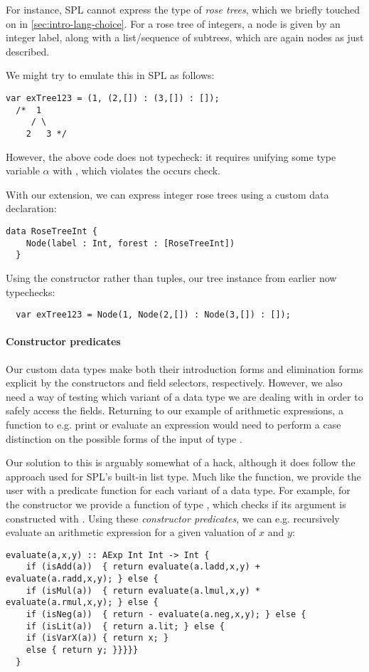 For instance, SPL cannot express the type of \emph{rose trees}, which we briefly
touched on in \cref{sec:intro-lang-choice}. For a rose tree of integers, a node
is given by an integer label, along with a list/sequence of subtrees, which are
again nodes as just described.

We might try to emulate this in SPL as follows:
\begin{lstlisting}[language=SPL]
  var exTree123 = (1, (2,[]) : (3,[]) : []);
  /*  1
     / \
    2   3 */
\end{lstlisting}
%
However, the above code does not typecheck: it requires unifying some type
variable $\alpha$ with \spl{(Int,[$\alpha$])}, which violates the occurs check.

With our extension, we can express integer rose trees using a custom data declaration:
\begin{lstlisting}[language=SPL]
  data RoseTreeInt {
    Node(label : Int, forest : [RoseTreeInt])
  }
\end{lstlisting}
%
Using the  constructor rather than tuples, our tree instance from
earlier now typechecks:
\begin{lstlisting}
  var exTree123 = Node(1, Node(2,[]) : Node(3,[]) : []);
\end{lstlisting}


\paragraph{Constructor predicates}
Our custom data types make both their introduction forms and elimination forms
explicit by the constructors and field selectors, respectively.
However, we also need a way of testing which variant of a data type we are
dealing with in order to safely access the fields. Returning to our example of
arithmetic expressions, a function to e.g. print or evaluate an expression would
need to perform a case distinction on the possible forms of the input of type
\spl{AExp}.

Our solution to this is arguably somewhat of a hack, although it does follow the
approach used for SPL's built-in list type. Much like the \spl{isEmpty}
function, we provide the user with a predicate function for each variant of a
data type. For example, for the  constructor we provide a function
\spl{isAdd} of type \spl{AExp -> Bool}, which checks if its argument is
constructed with \spl{Add}.
Using these \emph{constructor predicates}, we can e.g. recursively evaluate an
arithmetic expression for a given valuation of $x$ and $y$:
\begin{lstlisting}[language=SPL]
  evaluate(a,x,y) :: AExp Int Int -> Int {
    if (isAdd(a))  { return evaluate(a.ladd,x,y) + evaluate(a.radd,x,y); } else {
    if (isMul(a))  { return evaluate(a.lmul,x,y) * evaluate(a.rmul,x,y); } else {
    if (isNeg(a))  { return - evaluate(a.neg,x,y); } else {
    if (isLit(a))  { return a.lit; } else {
    if (isVarX(a)) { return x; }
    else { return y; }}}}}
  }
\end{lstlisting}

